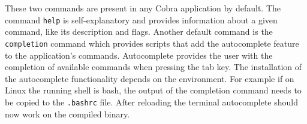 These two commands are present in any Cobra application by default. The command \texttt{help} is self-explanatory and provides information about a given command, like its description and flags. Another default command is the \texttt{completion} command which provides scripts that add the autocomplete feature to the application's commands. Autocomplete provides the user with the completion of available commands when pressing the tab key. The installation of the autocomplete functionality depends on the environment. For example if on Linux the running shell is bash, the output of the completion command needs to be copied to the \texttt{.bashrc} file. After reloading the terminal autocomplete should now work on the compiled binary.
